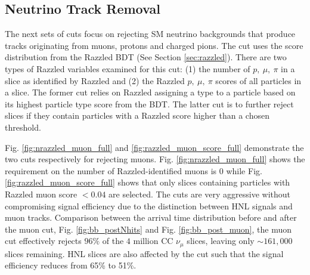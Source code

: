 \subsection{Neutrino Track Removal}
\label{sec:trk_cut}

The next sets of cuts focus on rejecting SM neutrino backgrounds that produce tracks originating from muons, protons and charged pions.
The cut uses the score distribution from the Razzled BDT (See Section \ref{sec:razzled}).
There are two types of Razzled variables examined for this cut: (1) the number of $p, \ \mu, \ \pi$ in a slice as identified by Razzled and (2) the Razzled $p, \ \mu, \ \pi$ scores of all particles in a slice.
The former cut relies on Razzled assigning a type to a particle based on its highest particle type score from the BDT.
The latter cut is to further reject slices if they contain particles with a Razzled score higher than a chosen threshold.

Fig. \ref{fig:nrazzled_muon_full} and \ref{fig:razzled_muon_score_full} demonstrate the two cuts respectively for rejecting muons.
Fig. \ref{fig:nrazzled_muon_full} shows the requirement on the number of Razzled-identified muons is 0 while Fig. \ref{fig:razzled_muon_score_full} shows that only slices containing particles with Razzled muon score $< 0.04$ are selected.
The cuts are very aggressive without compromising signal efficiency due to the distinction between HNL signals and muon tracks.  
Comparison between the arrival time distribution before and after the muon cut, Fig. \ref{fig:bb_postNhits} and Fig. \ref{fig:bb_post_muon}, the muon cut effectively rejects $96\%$ of the $4$ million CC $\nu_\mu$ slices, leaving only $\sim161,000$ slices remaining.
HNL slices are also affected by the cut such that the signal efficiency reduces from 65\% to 51\%.

